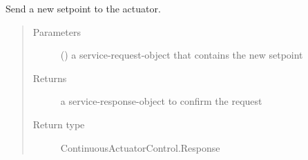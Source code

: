 \documentclass[a4paper,12pt,twoside]{article}
\begin{document}
\begin{fulllineitems}
\begin{fulllineitems}
\begin{quote}
\begin{description}
\end{description}\end{quote}

\end{fulllineitems}


\begin{fulllineitems}
\label{\detokenize{meso_control_pkg:meso_control_pkg.sps_continuous_actuator_node.SpsContinuousActuator.set_actuator}}
Send a new setpoint to the actuator.
\begin{quote}\begin{description}
\item[{Parameters}] \leavevmode
{} () \textendash{} a service-request-object that contains the new setpoint

\item[{Returns}] \leavevmode
a service-response-object to confirm the request

\item[{Return type}] \leavevmode
ContinuousActuatorControl.Response

\end{description}\end{quote}

\end{fulllineitems}


\end{fulllineitems}

\label{\detokenize{meso_control_pkg:module-meso_control_pkg.water_sensor_node}}
\end{document}
